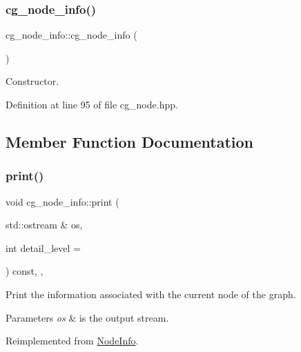 \subsubsection{\texorpdfstring{cg\+\_\+node\+\_\+info()}{cg\_node\_info()}}
{\footnotesize\ttfamily cg\+\_\+node\+\_\+info\+::cg\+\_\+node\+\_\+info (\begin{DoxyParamCaption}{ }\end{DoxyParamCaption})\hspace{0.3cm}{\ttfamily [inline]}}



Constructor. 



Definition at line 95 of file cg\+\_\+node.\+hpp.



\subsection{Member Function Documentation}
\mbox{\label{structcg__node__info_a010ce271e49a819e639abc65ec0cbdcc}} 
\subsubsection{\texorpdfstring{print()}{print()}}
{\footnotesize\ttfamily void cg\+\_\+node\+\_\+info\+::print (\begin{DoxyParamCaption}\item[{std\+::ostream \&}]{os,  }\item[{int}]{detail\+\_\+level = {} }\end{DoxyParamCaption}) const\hspace{0.3cm}{\ttfamily [inline]}, {\ttfamily [override]}, {\ttfamily [virtual]}}



Print the information associated with the current node of the graph. 


\begin{DoxyParams}{Parameters}
{\em os} & is the output stream. \\
\hline
\end{DoxyParams}


Reimplemented from \hyperlink{structNodeInfo_adacfeaff90018a35bde5211edbbd1114}{Node\+Info}.



